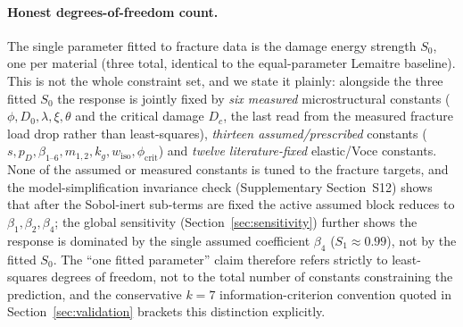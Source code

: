 \documentclass[twocolumn]{sagej}
\begin{document}
\paragraph{Honest degrees-of-freedom count.}
The single parameter fitted to fracture data is the damage energy strength $S_0$, one per material (three total, identical to the equal-parameter Lemaitre baseline). This is not the whole constraint set, and we state it plainly: alongside the three fitted $S_0$ the response is jointly fixed by \emph{six measured} microstructural constants ($\phi, D_0, \lambda, \xi, \theta$ and the critical damage $D_c$, the last read from the measured fracture load drop rather than least-squares), \emph{thirteen assumed/prescribed} constants ($s, p_D, \beta_{1\text{--}6}, m_{1,2}, k_g, w_{\mathrm{iso}}, \phi_{\mathrm{crit}}$) and \emph{twelve literature-fixed} elastic/Voce constants. None of the assumed or measured constants is tuned to the fracture targets, and the model-simplification invariance check (Supplementary Section~S12) shows that after the Sobol-inert sub-terms are fixed the active assumed block reduces to $\beta_1, \beta_2, \beta_4$; the global sensitivity (Section~\ref{sec:sensitivity}) further shows the response is dominated by the single assumed coefficient $\beta_4$ ($S_1 \approx 0.99$), not by the fitted $S_0$. The ``one fitted parameter'' claim therefore refers strictly to least-squares degrees of freedom, not to the total number of constants constraining the prediction, and the conservative $k=7$ information-criterion convention quoted in Section~\ref{sec:validation} brackets this distinction explicitly.
\end{document}
